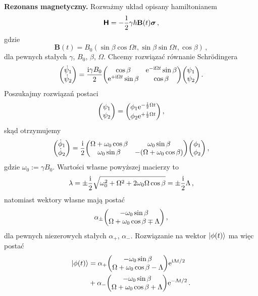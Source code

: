 \documentclass{myclass}
\begin{document}
\textbf{Rezonans magnetyczny.} Rozważmy układ opisany hamiltonianem
\begin{equation*}
    \boldsymbol{\mathsf{H}} = -\frac{1}{2}\gamma\hbar\mathbf{B}(t)\boldsymbol{\sigma}\,,
\end{equation*}    
gdzie
\begin{equation*}
    \mathbf{B}(t) = B_0(\sin\beta\cos\Omega t,\sin\beta\sin\Omega t, \cos\beta)\,,
\end{equation*}
dla pewnych stałych \(\gamma\), \(B_0\), \(\beta\), \(\Omega\). Chcemy rozwiązać równanie
Schr\"{o}dingera
\begin{equation*}
    \mqty(\dot{\psi}_1 \\ \dot{\psi}_2) = \frac{\im\gamma B_0}{2}\mqty(\cos\beta & \e^{-\im\Omega t}\sin\beta \\ \e^{+\im\Omega t}\sin\beta & \cos\beta) \mqty(\psi_1 \\ \psi_2)\,.
\end{equation*}
Poszukajmy rozwiązań postaci
\begin{equation*}
    \mqty(\psi_1 \\ \psi_2) = \mqty(\phi_1\e^{-\frac{\im}{2}\Omega t} \\ \phi_2 \e^{+\frac{\im}{2}\Omega t})\,,
\end{equation*}
skąd otrzymujemy
\begin{equation*}
    \mqty(\dot{\phi}_1 \\ \dot{\phi}_2) = \frac{\im}{2} \mqty(\Omega +\omega_0\cos\beta & \omega_0\sin\beta \\ \omega_0\sin\beta & -(\Omega +\omega_0\cos\beta)) \mqty(\phi_1 \\ \phi_2)\,,
\end{equation*}
gdzie \(\omega_0 := \gamma B_0\). Wartości własne powyższej macierzy to
\begin{equation*}
    \lambda = \pm\frac{\mathrm{i}}{2}\sqrt{\omega_0^2 + \Omega^2 + 2\omega_0\Omega\cos\beta} = \pm\frac{\mathrm{i}}{2}\Lambda\,,
\end{equation*}
natomiast wektory własne mają postać
\begin{equation*}
    \alpha_\pm \mqty( -\omega_0\sin\beta \\ \Omega + \omega_0\cos\beta \mp \Lambda)\,,
\end{equation*}
dla pewnych niezerowych stałych \(\alpha_+\), \(\alpha_-\). Rozwiązanie na wektor \(\ket{\phi(t)}\)
ma więc postać
\begin{equation*}
    \begin{split}
        \ket{\phi(t)} &= \alpha_+\mqty(-\omega_0\sin\beta \\ \Omega+\omega_0\cos\beta - \Lambda)\e^{\im\Lambda t/2} \\
        &+ \alpha_- \mqty(-\omega_0\sin\beta \\ \Omega + \omega_0\cos\beta+\Lambda)\e^{-\Lambda t/2}\,.
    \end{split}
\end{equation*}
\end{document}
